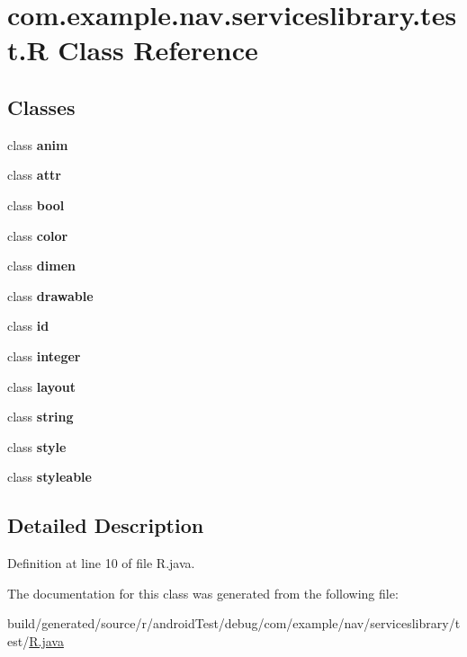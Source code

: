 \hypertarget{classcom_1_1example_1_1nav_1_1serviceslibrary_1_1test_1_1_r}{}\section{com.\+example.\+nav.\+serviceslibrary.\+test.\+R Class Reference}
\label{classcom_1_1example_1_1nav_1_1serviceslibrary_1_1test_1_1_r}
\subsection*{Classes}
\begin{DoxyCompactItemize}
\item 
class {\bfseries anim}
\item 
class {\bfseries attr}
\item 
class {\bfseries bool}
\item 
class {\bfseries color}
\item 
class {\bfseries dimen}
\item 
class {\bfseries drawable}
\item 
class {\bfseries id}
\item 
class {\bfseries integer}
\item 
class {\bfseries layout}
\item 
class {\bfseries string}
\item 
class {\bfseries style}
\item 
class {\bfseries styleable}
\end{DoxyCompactItemize}


\subsection{Detailed Description}


Definition at line 10 of file R.\+java.



The documentation for this class was generated from the following file\+:\begin{DoxyCompactItemize}
\item 
build/generated/source/r/android\+Test/debug/com/example/nav/serviceslibrary/test/\hyperlink{android_test_2debug_2com_2example_2nav_2serviceslibrary_2test_2_r_8java}{R.\+java}\end{DoxyCompactItemize}
